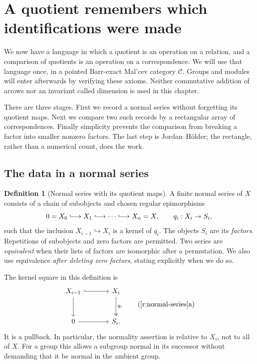 \documentclass[11pt]{article}
\theoremstyle{definition}
\newtheorem{definition}[theorem]{Definition}
\theoremstyle{remark}\newtheorem{remark}[theorem]{Remark}
\begin{document}
\section{A quotient remembers which identifications were made}
\label{r:chapter}

We now have a language in which a quotient is an operation on a relation,
and a comparison of quotients is an operation on a correspondence.  We will
use that language once, in a pointed Barr-exact Mal'cev category
$\mathcal C$.  Groups and modules will enter afterwards by verifying these
axioms.  Neither commutative addition of arrows nor an invariant called
dimension is used in this chapter.

There are three stages.  First we record a normal series without forgetting
its quotient maps.  Next we compare two such records by a rectangular array
of correspondences.  Finally simplicity prevents the comparison from
breaking a factor into smaller nonzero factors.  The last step is
Jordan--H\"older; the rectangle, rather than a numerical count, does the work.

\subsection{The data in a normal series}

\begin{definition}[Normal series with its quotient maps]
\label{r:normal-series}
A finite normal series of $X$ consists of a chain of subobjects and chosen
regular epimorphisms
\[
  0=X_0\lhook\joinrel\longrightarrow X_1
  \lhook\joinrel\longrightarrow\cdots
  \lhook\joinrel\longrightarrow X_n=X,
  \qquad q_i:X_i\twoheadrightarrow S_i,
\]
such that the inclusion $X_{i-1}\hookrightarrow X_i$ is a kernel of $q_i$.
The objects $S_i$ are its \emph{factors}.  Repetitions of subobjects and zero
factors are permitted.  Two series are \emph{equivalent} when their lists of
factors are isomorphic after a permutation.  We also use equivalence
\emph{after deleting zero factors}, stating explicitly when we do so.
\end{definition}

The kernel square in this definition is
\[
\begin{tikzcd}[column sep=large,row sep=large]
X_{i-1}\arrow[r,hook]\arrow[d] & X_i\arrow[d,two heads,"q_i"]\\
0\arrow[r] & S_i .
\end{tikzcd}
\tag{\ref{r:normal-series}a}
\]
It is a pullback.  In particular, the normality assertion is relative to
$X_i$, not to all of $X$.  For a group this allows a subgroup normal in its
successor without demanding that it be normal in the ambient group.
\end{document}
